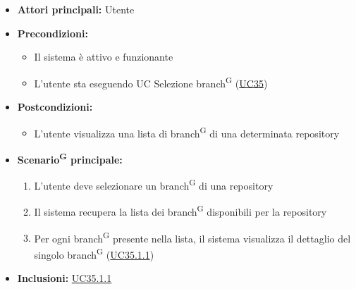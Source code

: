 \documentclass[a4paper, 11pt]{article}
\begin{document}
\begin{itemize}
    \item \textbf{Attori principali:} Utente
    \item \textbf{Precondizioni:}
    \begin{itemize}
        \item Il sistema è attivo e funzionante
        \item L'utente sta eseguendo UC Selezione branch\textsuperscript{G} (\hyperref[UC35]{UC35})
    \end{itemize}
    \item \textbf{Postcondizioni:}
    \begin{itemize}
        \item L'utente visualizza una lista di branch\textsuperscript{G} di una determinata repository
    \end{itemize}
    \item \textbf{Scenario\textsuperscript{G} principale:}
    \begin{enumerate}
        \item L'utente deve selezionare un branch\textsuperscript{G} di una repository
        \item Il sistema recupera la lista dei branch\textsuperscript{G} disponibili per la repository
        \item Per ogni branch\textsuperscript{G} presente nella lista, il sistema visualizza il dettaglio del singolo branch\textsuperscript{G} (\hyperref[UC35.1.1]{UC35.1.1})
    \end{enumerate}
    \item \textbf{Inclusioni:} \hyperref[UC35.1.1]{UC35.1.1}
\end{itemize}
\end{document}
